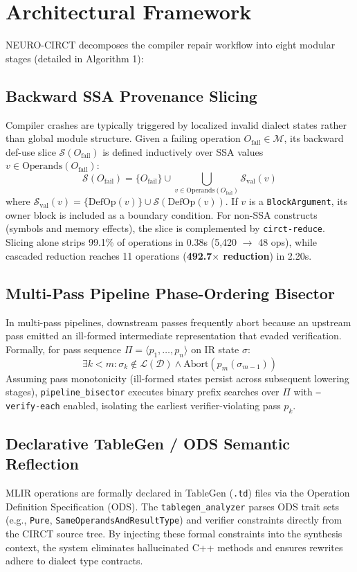 \documentclass[conference]{IEEEtran}
\begin{document}
\section{Architectural Framework}
NEURO-CIRCT decomposes the compiler repair workflow into eight modular stages (detailed in Algorithm 1):

\subsection{Backward SSA Provenance Slicing}
Compiler crashes are typically triggered by localized invalid dialect states rather than global module structure. Given a failing operation $O_{\text{fail}} \in \mathcal{M}$, its backward def-use slice $\mathcal{S}(O_{\text{fail}})$ is defined inductively over SSA values $v \in \text{Operands}(O_{\text{fail}})$:
\begin{equation}
\mathcal{S}(O_{\text{fail}}) = \{ O_{\text{fail}} \} \cup \bigcup_{v \in \text{Operands}(O_{\text{fail}})} \mathcal{S}_{\text{val}}(v)
\end{equation}
where $\mathcal{S}_{\text{val}}(v) = \{\text{DefOp}(v)\} \cup \mathcal{S}(\text{DefOp}(v))$. If $v$ is a \texttt{BlockArgument}, its owner block is included as a boundary condition. For non-SSA constructs (symbols and memory effects), the slice is complemented by \texttt{circt-reduce}. Slicing alone strips 99.1\% of operations in 0.38s (5,420 $\to$ 48 ops), while cascaded reduction reaches 11 operations (\textbf{492.7$\times$ reduction}) in 2.20s.

\subsection{Multi-Pass Pipeline Phase-Ordering Bisector}
In multi-pass pipelines, downstream passes frequently abort because an upstream pass emitted an ill-formed intermediate representation that evaded verification. Formally, for pass sequence $\Pi = \langle p_1, \dots, p_n \rangle$ on IR state $\sigma$:
\begin{equation}
\exists k < m : \sigma_k \notin \mathcal{L}(\mathcal{D}) \wedge \text{Abort}(p_m(\sigma_{m-1}))
\end{equation}
Assuming pass monotonicity (ill-formed states persist across subsequent lowering stages), \texttt{pipeline\_bisector} executes binary prefix searches over $\Pi$ with \texttt{--verify-each} enabled, isolating the earliest verifier-violating pass $p_k$.

\subsection{Declarative TableGen / ODS Semantic Reflection}
MLIR operations are formally declared in TableGen (\texttt{.td}) files via the Operation Definition Specification (ODS). The \texttt{tablegen\_analyzer} parses ODS trait sets (e.g., \texttt{Pure}, \texttt{SameOperandsAndResultType}) and verifier constraints directly from the CIRCT source tree. By injecting these formal constraints into the synthesis context, the system eliminates hallucinated C++ methods and ensures rewrites adhere to dialect type contracts.
\end{document}
